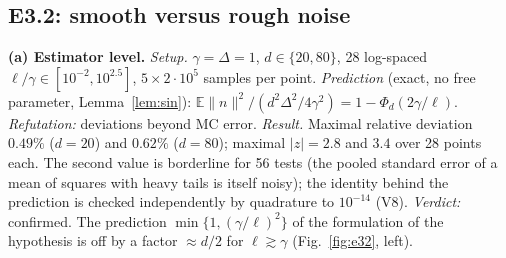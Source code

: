 \documentclass[11pt,a4paper]{article}
\numberwithin{equation}{section}
\theoremstyle{definition}
\theoremstyle{remark}
\newcommand{\E}{\mathbb E}\newcommand{\R}{\mathbb R}\newcommand{\Z}{\mathbb Z}\newcommand{\Prob}{\mathbb P}
\newcommand{\norm}[1]{\lVert #1\rVert}\newcommand{\abs}[1]{\lvert #1\rvert}\newcommand{\ip}[2]{\langle #1,#2\rangle}
\begin{document}
\subsection{E3.2: smooth versus rough noise}\label{sec:e32}
\textbf{(a) Estimator level.} \emph{Setup.} $\gamma=\Delta=1$, $d\in\{20,80\}$, 28 log-spaced $\ell/\gamma\in[10^{-2},10^{2.5}]$, $5\times2\cdot10^5$ samples per point. \emph{Prediction} (exact, no free parameter, Lemma~\ref{lem:sin}): $\E\norm n^2/(d^2\Delta^2/4\gamma^2)=1-\Phi_d(2\gamma/\ell)$. \emph{Refutation:} deviations beyond MC error. \emph{Result.} Maximal relative deviation $0.49\%$ ($d=20$) and $0.62\%$ ($d=80$); maximal $\abs z=2.8$ and $3.4$ over 28 points each. The second value is borderline for 56 tests (the pooled standard error of a mean of squares with heavy tails is itself noisy); the identity behind the prediction is checked independently by quadrature to $10^{-14}$ (V8). \emph{Verdict:} confirmed. The prediction $\min\{1,(\gamma/\ell)^2\}$ of the formulation of the hypothesis is off by a factor $\approx d/2$ for $\ell\gtrsim\gamma$ (Fig.~\ref{fig:e32}, left).
\end{document}
